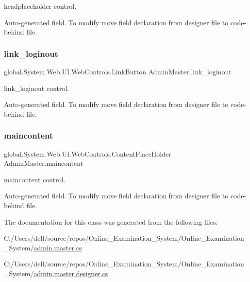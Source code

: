 headplaceholder control. 

Auto-\/generated field. To modify move field declaration from designer file to code-\/behind file. \mbox{\label{class_admin_master_af034ac4b0169ee38de68a4890606ff72}} 
\subsubsection{\texorpdfstring{link\_loginout}{link\_loginout}}
{\footnotesize\ttfamily global.\+System.\+Web.\+U\+I.\+Web\+Controls.\+Link\+Button Admin\+Master.\+link\+\_\+loginout\hspace{0.3cm}{\ttfamily [protected]}}



link\+\_\+loginout control. 

Auto-\/generated field. To modify move field declaration from designer file to code-\/behind file. \mbox{\label{class_admin_master_ae059b3c96b9ee11748016a1a433f960f}} 
\subsubsection{\texorpdfstring{maincontent}{maincontent}}
{\footnotesize\ttfamily global.\+System.\+Web.\+U\+I.\+Web\+Controls.\+Content\+Place\+Holder Admin\+Master.\+maincontent\hspace{0.3cm}{\ttfamily [protected]}}



maincontent control. 

Auto-\/generated field. To modify move field declaration from designer file to code-\/behind file. 

The documentation for this class was generated from the following files\+:\begin{DoxyCompactItemize}
\item 
C\+:/\+Users/dell/source/repos/\+Online\+\_\+\+Examination\+\_\+\+System/\+Online\+\_\+\+Examination\+\_\+\+System/\mbox{\hyperlink{admin_8master_8cs}{admin.\+master.\+cs}}\item 
C\+:/\+Users/dell/source/repos/\+Online\+\_\+\+Examination\+\_\+\+System/\+Online\+\_\+\+Examination\+\_\+\+System/\mbox{\hyperlink{admin_8master_8designer_8cs}{admin.\+master.\+designer.\+cs}}\end{DoxyCompactItemize}

